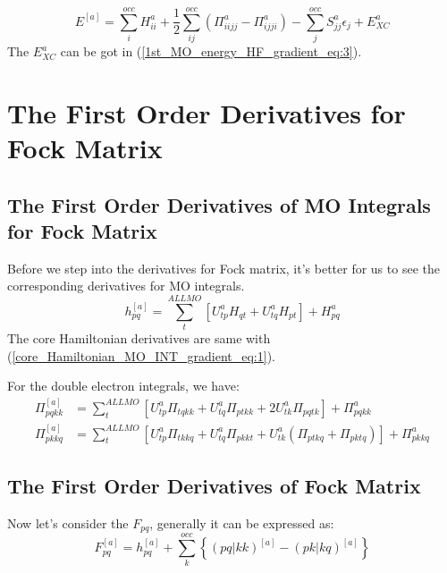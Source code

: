 \begin{equation}
 \label{FOD_energy_KS_derivatives_eq:1}
E^{[a]} = \sum_{i}^{occ}H^{a}_{ii} + \frac{1}{2}\sum_{ij}^{occ}\left(
\Pi^{a}_{iijj} -
\Pi^{a}_{ijji}\right) - \sum_{j}^{occ}S^{a}_{jj}\epsilon_{j} + E_{XC}^{a}
\end{equation}
The $E_{XC}^{a}$ can be got in (\ref{1st_MO_energy_HF_gradient_eq:3}).

\section{The First Order Derivatives for Fock Matrix}
%
%
%
\subsection{The First Order Derivatives of MO Integrals for Fock Matrix}
%
%
%
%
Before we step into the derivatives for Fock matrix,
it's better for us to see the corresponding derivatives for MO integrals.
\begin{equation}
\label{FOD_MO_FOCK_derivatives_eq:1}
h_{pq}^{[a]}  = \sum_{t}^{ALL MO}\left[U^{a}_{tp}H_{qt} +
  U^{a}_{tq}H_{pt}\right]
  + H^{a}_{pq}  
\end{equation}
The core Hamiltonian derivatives are same with
(\ref{core_Hamiltonian_MO_INT_gradient_eq:1}).  

For the double electron integrals, we have:
\begin{align}
  \label{FOD_MO_FOCK_derivatives_eq:2}
\Pi_{pqkk}^{[a]} &= \sum_{t}^{ALL MO}\left[ 
U^{a}_{tp}\Pi_{tqkk} +
U^{a}_{tq}\Pi_{ptkk} + 
2U^{a}_{tk}\Pi_{pqtk}   
\right] + \Pi^{a}_{pqkk} \nonumber \\
\Pi_{pkkq}^{[a]} &= \sum_{t}^{ALL MO}\left[ 
U^{a}_{tp}\Pi_{tkkq} +
U^{a}_{tq}\Pi_{pkkt} + 
U^{a}_{tk}\left(\Pi_{ptkq} + \Pi_{pktq}\right)   
\right] + \Pi^{a}_{pkkq}
\end{align}
    
\subsection{The First Order Derivatives of Fock Matrix}
%
%
%
%
Now let's consider the $F_{pq}$, generally it can be expressed as:
\begin{equation}
    \label{FOD_FOCK_hf_derivatives_eq:1}
F_{pq}^{[a]} = h_{pq}^{[a]} + 
\sum_{k}^{occ}\left \{  (pq|kk)^{[a]} - ( pk|kq)^{[a]}\right \} 
\end{equation}

